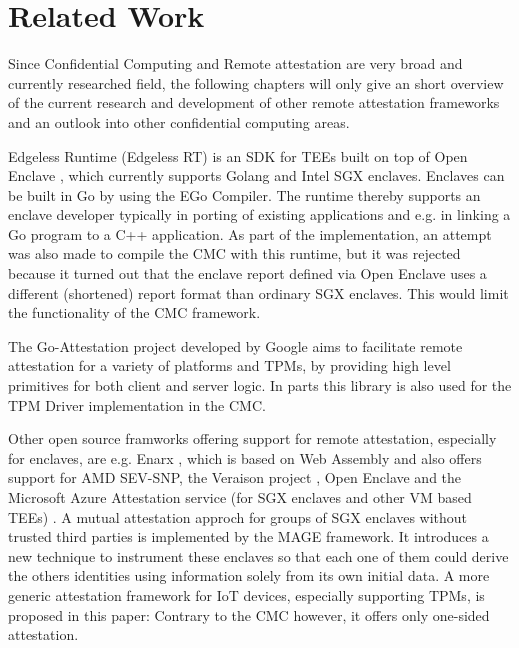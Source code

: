
\chapter{Related Work}\label{chapter:related_work}
Since Confidential Computing and Remote attestation are very broad and currently researched field, the following chapters will only give an short overview of the current research and development of other remote attestation frameworks and an outlook into other confidential computing areas.

Edgeless Runtime (Edgeless RT) is an SDK for TEEs built on top of Open Enclave \cite{openenclave}, which currently supports Golang and Intel SGX enclaves. Enclaves can be built in Go by using the EGo Compiler. The runtime thereby supports an enclave developer typically in porting of existing applications and e.g. in linking a Go program to a C++ application. \cite{edgelessrt}
As part of the implementation, an attempt was also made to compile the CMC with this runtime, but it was rejected because it turned out that the enclave report defined via Open Enclave uses a different (shortened) report format than ordinary SGX enclaves. This would limit the functionality of the CMC framework.

The Go-Attestation project \cite{go-attestation} developed by Google aims to facilitate remote attestation for a variety of platforms and TPMs, by providing high level primitives for both client and server logic. In parts this library is also used for the TPM Driver implementation in the CMC. 

Other open source framworks offering support for remote attestation, especially for enclaves, are e.g. Enarx \cite{enarx}, which is based on Web Assembly and also offers support for AMD SEV-SNP, the Veraison project \cite{veraison}, Open Enclave and the Microsoft Azure Attestation service (for SGX enclaves and other VM based TEEs) \cite{microsoft-azure-attestation}. 
A mutual attestation approch for groups of SGX enclaves without trusted third parties is implemented by the MAGE framework. 
It introduces a new technique to instrument these enclaves so that each one of them could derive the others identities using information solely from its own initial data. \cite{mage}
A more generic attestation framework for IoT devices, especially supporting TPMs, is proposed in this paper: \cite{iot-ra-framework}
Contrary to the CMC however, it offers only one-sided attestation. 

